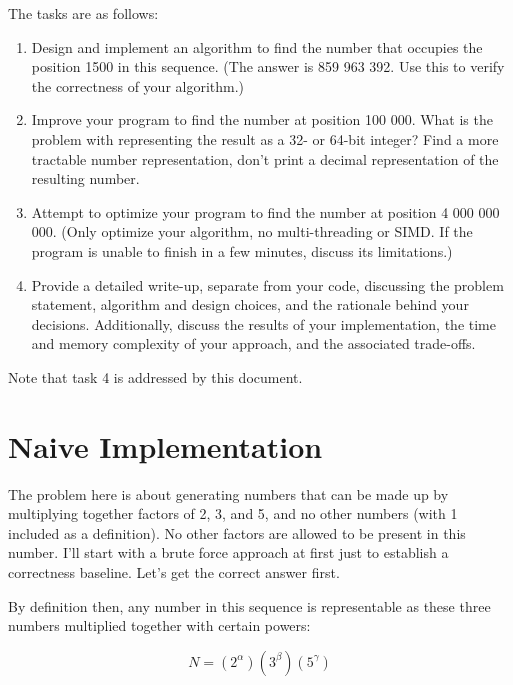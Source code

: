\documentclass{article}
\begin{document}
The tasks are as follows:
\begin{enumerate}
    \item Design and implement an algorithm to find the number that occupies the position 1500 in this sequence. (The answer is 859 963 392. Use this to verify the correctness of your algorithm.)

    \item Improve your program to find the number at position 100 000. What is the problem with representing the result as a 32- or 64-bit integer? Find a more tractable number representation, don't print a decimal representation of the resulting number.

    \item Attempt to optimize your program to find the number at position 4 000 000 000. (Only optimize your algorithm, no multi-threading or SIMD. If the program is unable to finish in a few minutes, discuss its limitations.)

    \item Provide a detailed write-up, separate from your code, discussing the problem statement, algorithm and design choices, and the rationale behind your decisions. Additionally, discuss the results of your implementation, the time and memory complexity of your approach, and the associated trade-offs.
\end{enumerate}

Note that task 4 is addressed by this document.

\newpage

\section{Naive Implementation}

The problem here is about generating numbers that can be made up by multiplying together factors of 2, 3, and 5, and no other numbers (with 1 included as a definition). No other factors are allowed to be present in this number. I'll start with a brute force approach at first just to establish a correctness baseline. Let's get the correct answer first. \newline

By definition then, any number in this sequence is representable as these three numbers multiplied together with certain powers:

\begin{equation}
    N = (2^{\alpha})(3^{\beta})(5^\gamma)
    \label{factorization}
\end{equation}
\end{document}
